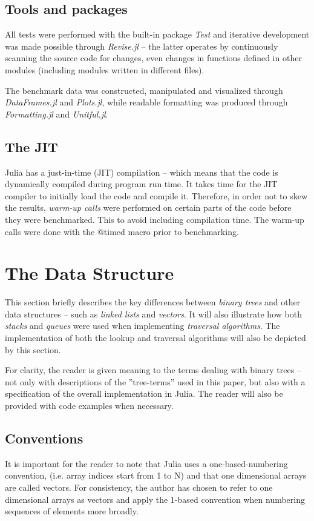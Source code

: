 \documentclass[a4paper, 11pt]{article}
\begin{document}
    \subsection*{Tools and packages}
    All tests were performed with the built-in package \emph{Test} and 
    iterative development was made possible through 
    \emph{Revise.jl} -- the latter operates by continuously
    scanning the source code for changes, even changes in functions defined in
    other modules (including modules written in different files).
    
    The benchmark data was constructed, manipulated and visualized through
    \emph{DataFrames.jl} and \emph{Plots.jl}, 
    while readable formatting was produced through 
    \emph{Formatting.jl} and \emph{Unitful.jl}. 

    \subsection*{The JIT}
    Julia has a just-in-time (JIT) compilation -- which means that the code is
    dynamically compiled during program run time.     
    It takes time for the JIT compiler to 
    initially load the code and compile it. Therefore, in order not to skew the
    results, \emph{warm-up calls} were performed on certain parts of the code
    before they were benchmarked. This to avoid including 
    compilation time. The warm-up calls were done with the @timed macro prior to
    benchmarking.

    \section*{The Data Structure}
    This section briefly describes the key differences between \emph{binary trees} 
    and other data structures -- such as \emph{linked lists} and \emph{vectors}. 
    It will also illustrate how both \emph{stacks} and \emph{queues} were used
    when implementing \emph{traversal algorithms}. 
    The implementation of both the lookup and traversal algorithms will also be
    depicted by this section.
    
    For clarity, the reader is given meaning to the terms dealing 
    with binary trees -- not only with descriptions of the
    ''tree-terms'' used in this paper, but also with a specification 
    of the overall implementation in Julia. The reader will also be provided with 
    code examples when necessary.

    \subsection*{Conventions}
    It is important for the reader to note that Julia uses a one-based-numbering
    convention, (i.e. array indices start from 1 to N) and that one dimensional
    arrays are called vectors. 
    For consistency, the author has chosen to refer to one dimensional
    arrays as vectors and apply the 1-based convention when numbering
    sequences of elements more broadly. 
    
\end{document}
